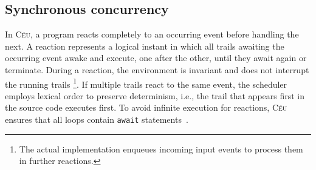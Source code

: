 \documentclass{acm_proc_article-sp}
\newcommand{\CEU}{\textsc{C\'{e}u}\xspace}
\newcommand{\code}[1] {{\small{\texttt{#1}}}}
\newcommand{\1}{\;}
\newcommand{\2}{\;\;}
\newcommand{\3}{\;\;\;}
\newcommand{\5}{\;\;\;\;\;}
\begin{document}

\subsection{Synchronous concurrency}
\label{sec.ceu.sync}

In \CEU, a program reacts completely to an occurring event before handling the 
next.
%
A reaction represents a logical instant in which all trails awaiting the 
occurring event awake and execute, one after the other, until they await again 
or terminate.
%
During a reaction, the environment is invariant and does not interrupt the 
running trails%
\footnote{
The actual implementation enqueues incoming input events to process them in 
further reactions.
}.
If multiple trails react to the same event, the scheduler employs lexical order 
to preserve determinism, i.e., the trail that appears first in the source code 
executes first.
%
To avoid infinite execution for reactions, \CEU ensures that all loops contain 
\code{await} statements~\cite{ceu.sensys13}.
\end{document}
